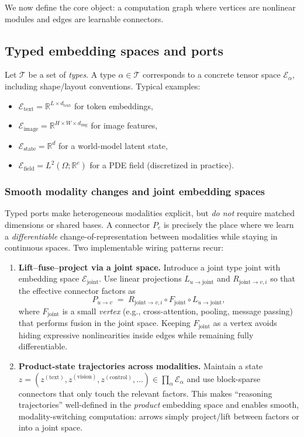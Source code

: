 \documentclass[11pt]{article}
\theoremstyle{definition}
\theoremstyle{plain}
\theoremstyle{remark}
\newcommand{\R}{\mathbb{R}}
\newcommand{\mc}[1]{\mathcal{#1}}
\newcommand{\Emb}{\mc{E}}
\begin{document}
We now define the core object: a computation graph where vertices are nonlinear modules and edges are learnable connectors.

\subsection{Typed embedding spaces and ports}
\label{sec:typed}

Let $\mc{T}$ be a set of \emph{types}.
A type $\alpha\in\mc{T}$ corresponds to a concrete tensor space $\Emb_\alpha$, including shape/layout conventions.
Typical examples:
\begin{itemize}[leftmargin=2em]
\item $\Emb_{\text{text}}=\R^{L\times d_\text{text}}$ for token embeddings,
\item $\Emb_{\text{image}}=\R^{H\times W\times d_\text{img}}$ for image features,
\item $\Emb_{\text{state}}=\R^{d}$ for a world-model latent state,
\item $\Emb_{\text{field}}=L^2(\Omega;\R^{c})$ for a PDE field (discretized in practice).
\end{itemize}

\subsubsection{Smooth modality changes and joint embedding spaces}
\label{sec:modal-smooth}

Typed ports make heterogeneous modalities explicit, but \emph{do not} require matched dimensions or shared bases.
A connector $P_e$ is precisely the place where we learn a \emph{differentiable} change-of-representation between modalities while staying in continuous spaces.
Two implementable wiring patterns recur:

\begin{enumerate}[leftmargin=2em]
\item \textbf{Lift--fuse--project via a joint space.}
Introduce a joint type $\text{joint}$ with embedding space $\Emb_{\text{joint}}$.
Use linear projections $L_{u\to \text{joint}}$ and $R_{\text{joint}\to v,i}$ so that the effective connector factors as
\[
P_{u\to v} \;=\; R_{\text{joint}\to v,i}\circ F_{\text{joint}}\circ L_{u\to \text{joint}},
\]
where $F_{\text{joint}}$ is a small \emph{vertex} (e.g., cross-attention, pooling, message passing) that performs fusion in the joint space.
Keeping $F_{\text{joint}}$ as a vertex avoids hiding expressive nonlinearities inside edges while remaining fully differentiable.

\item \textbf{Product-state trajectories across modalities.}
Maintain a state $z=(z^{(\text{text})},z^{(\text{vision})},z^{(\text{control})},\ldots)\in \prod_{\alpha}\Emb_{\alpha}$ and use block-sparse connectors that only touch the relevant factors.
This makes ``reasoning trajectories'' well-defined in the \emph{product} embedding space and enables smooth, modality-switching computation: arrows simply project/lift between factors or into a joint space.
\end{enumerate}
\end{document}
